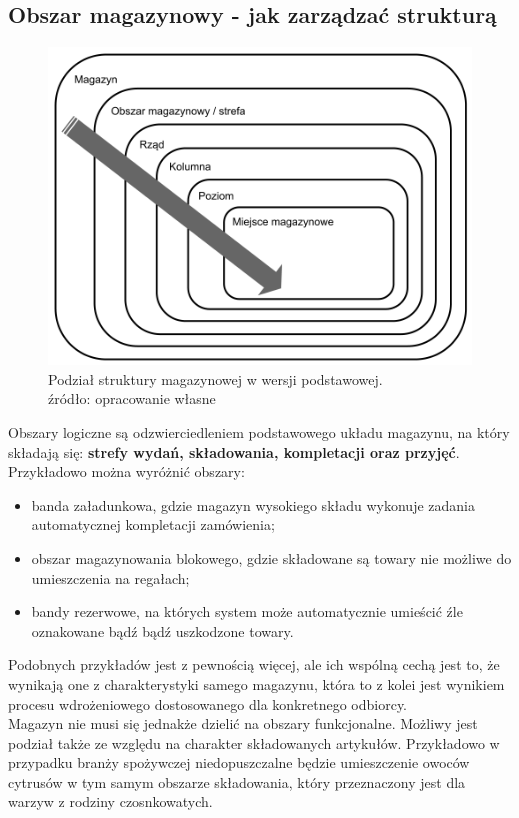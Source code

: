 	\subsection{Obszar magazynowy - jak zarządzać strukturą}	
		\begin{figure}[h]
			\centering
			\includegraphics[width=\textwidth]{images/unit_structure}
			\caption[Podstawowa struktura magazyny]{
					Podział struktury magazynowej w wersji podstawowej. \\
					źródło: opracowanie własne
			}
			\label{fig:c5:unit_structure}
		\end{figure}
		Obszary logiczne są odzwierciedleniem podstawowego układu magazynu, na który składają się:
		\textbf{strefy wydań, składowania, kompletacji oraz przyjęć}. Przykładowo można wyróżnić obszary:
		\begin{itemize}
			\item banda załadunkowa, gdzie magazyn wysokiego składu wykonuje zadania automatycznej kompletacji
			zamówienia;
			\item obszar magazynowania blokowego, gdzie składowane są towary nie możliwe do umieszczenia
			na regałach;
			\item bandy rezerwowe, na których system może automatycznie umieścić źle oznakowane bądź bądź
			uszkodzone towary.
		\end{itemize}
		Podobnych przykładów jest z pewnością więcej, ale ich wspólną cechą jest to, że wynikają one z 
		charakterystyki samego magazynu, która to z kolei jest wynikiem procesu wdrożeniowego dostosowanego
		dla konkretnego odbiorcy.\\
		Magazyn nie musi się jednakże dzielić na obszary funkcjonalne. Możliwy jest podział także ze względu
		na charakter składowanych artykułów. Przykładowo w przypadku branży spożywczej niedopuszczalne będzie
		umieszczenie owoców cytrusów w tym samym obszarze składowania, który przeznaczony jest dla 
		warzyw z rodziny czosnkowatych.
